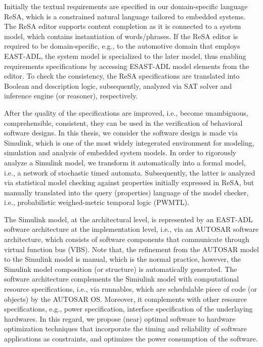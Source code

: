 Initially the textual requirements are specified in our domain-specific language ReSA, which is a constrained natural language tailored to embedded systems. The ReSA editor supports content completion as it is connected to a system model, which contains instantiation of words/phrases. If the ReSA editor is required to be domain-specific, e.g., to the automotive domain that employs EAST-ADL, the system model is specialized to the later model, thus enabling requirements specifications by accessing ESAST-ADL model elements from the editor. To check the consistency, the ReSA specifications are translated into Boolean and description logic, subsequently, analyzed via SAT solver and inference engine (or reasoner), respectively.

After the quality of the specifications are improved, i.e., become unambiguous,  comprehensible, consistent, they can be used in the verification of behavioral software designs. In this thesis, we consider the software design is made via Simulink, which is one of the most widely integerated environment for modeling, simulation and analysis of embedded system models. In order to rigorously analyze a Simulink model, we transform it automatically into a formal model, i.e., a network of stochastic timed automata. Subsequently, the latter is analyzed via statistical model checking against properties initially expressed in ReSA, but manually translated into the query (properties) language of the model checker, i.e., probabilistic weighed-metric temporal logic (PWMTL).

The Simulink model, at the architectural level, is represented by an EAST-ADL software architecture at the implementation level, i.e., via an AUTOSAR software architecture, which consists of software components that communicate through virtual function bus (VBS).  Note that, the refinement from the AUTOSAR model to the Simulink model is manual, which is the normal practice, however, the Simulink model composition (or structure) is automatically generated. The software architecture complements the Simiulink model with computational resource specifications, i.e., via runnables, which are schedulable piece of code (or objects) by the AUTOSAR OS. Moreover, it complements with other resource specifications, e.g., power specification, interface specification of the underlaying hardwares. In this regard, we propose (near) optimal software to hardware optimization techniques that incorporate the timing and reliability of software applications as constraints, and optimizes the power consumption of the software.


